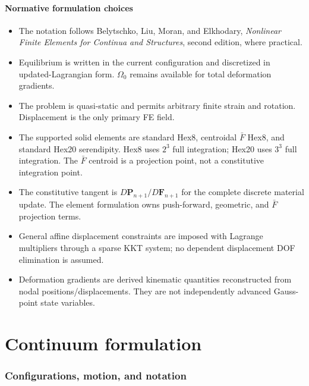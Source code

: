 \documentclass[11pt,a4paper]{article}
\newcommand{\bs}[1]{\boldsymbol{#1}}
\begin{document}
\subsection{Normative formulation choices}

\begin{itemize}
  \item The notation follows Belytschko, Liu, Moran, and Elkhodary, \emph{Nonlinear Finite Elements for Continua and Structures}, second edition, where practical.
  \item Equilibrium is written in the current configuration and discretized in updated-Lagrangian form. $\Omega_0$ remains available for total deformation gradients.
  \item The problem is quasi-static and permits arbitrary finite strain and rotation. Displacement is the only primary FE field.
  \item The supported solid elements are standard Hex8, centroidal $\bar F$ Hex8, and standard Hex20 serendipity. Hex8 uses $2^3$ full integration; Hex20 uses $3^3$ full integration. The $\bar F$ centroid is a projection point, not a constitutive integration point.
  \item The constitutive tangent is $D\bs P_{n+1}/D\bs F_{n+1}$ for the complete discrete material update. The element formulation owns push-forward, geometric, and $\bar F$ projection terms.
  \item General affine displacement constraints are imposed with Lagrange multipliers through a sparse KKT system; no dependent displacement DOF elimination is assumed.
  \item Deformation gradients are derived kinematic quantities reconstructed from nodal positions/displacements. They are not independently advanced Gauss-point state variables.
\end{itemize}

\part{Continuum formulation}
\section{Configurations, motion, and notation}
\end{document}
